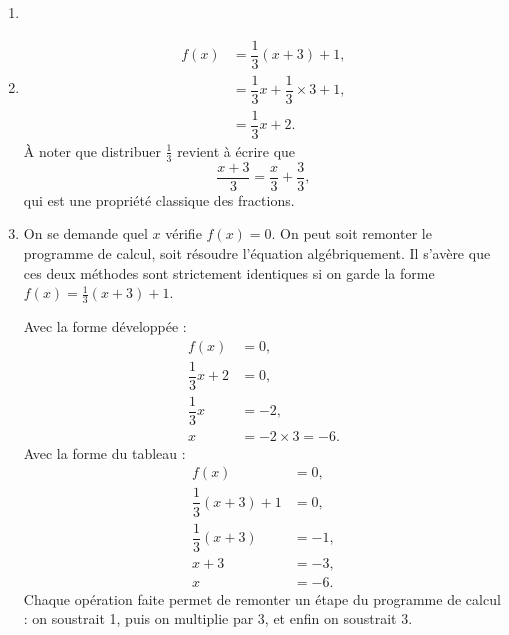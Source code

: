 {\begin{enumerate}
		$f(1) = \frac13 \times 4 + 1 = \frac73$.
		\item[]
		\item
		\begin{align*}	
			f(x) &= \dfrac13(x+3) + 1, \\
				&= \dfrac13 x + \dfrac13 \times 3 + 1, \\
				&= \dfrac13x + 2.
		\end{align*}
		À noter que distribuer $\frac13$ revient à écrire que
			\[  \dfrac{x+3}{3} =  \dfrac{x}{3} +  \dfrac{3}{3}, \]
		qui est une propriété classique des fractions.
		\item
		On se demande quel $x$ vérifie $f(x) = 0$.
		On peut soit remonter le programme de calcul, soit résoudre l'équation algébriquement.
		Il s'avère que ces deux méthodes sont strictement identiques si on garde la forme $f(x) = \frac13(x+3) + 1$.
		
		Avec la forme développée :
			\begin{align*}
				f(x) &= 0, \\
				\dfrac13 x + 2 &= 0, \\
				\dfrac13 x &= - 2, \\
				x &= -2 \times 3 = -6.
			\end{align*}
		Avec la forme du tableau : 
			\begin{align*}
				f(x) &= 0, \\
				\dfrac13 (x+3) + 1 &= 0, \\
				\dfrac13 (x+3) &= - 1, \\
				x+3 &= -3, \\
				x &= - 6.
			\end{align*}
		Chaque opération faite permet de remonter un étape du programme de calcul : on soustrait 1, puis on multiplie par 3, et enfin on soustrait 3.
	\end{enumerate}
}


